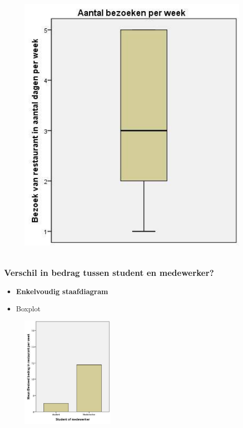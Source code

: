 \documentclass{beamer}
\begin{document}
\begin{frame}
\begin{columns}
\begin{column}{0.5\textwidth}
        \begin{figure}
          \centering
          \includegraphics[width=1.00\textwidth]{img/boxplotStudenten.jpg}
          \label{fig:boxplotStudenten2}
        \end{figure}

      \end{column}
    \end{columns}
  \end{frame}

  \begin{frame}
    \frametitle{Verschil in bedrag tussen student en medewerker?}
    \begin{itemize}
      \item \textbf{Enkelvoudig staafdiagram}
      \item  Boxplot
    \end{itemize}
    \begin{figure}
      \centering
      \includegraphics[width=0.4\textwidth]{img/studentenstaaf.jpg}
      \label{fig:studentenstaaf}
    \end{figure}

  \end{frame}
\end{document}
